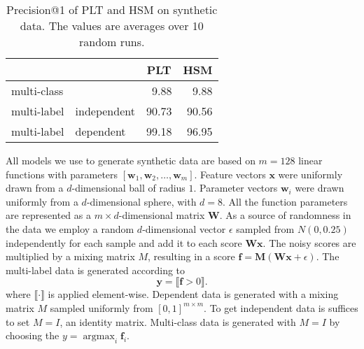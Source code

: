 \documentclass{article}
\renewcommand{\vec}[1]{\boldsymbol{#1}}
\newcommand{\bx}{\vec{x}}
\newcommand{\by}{\vec{y}}
\newcommand{\assert}[1]{\llbracket #1 \rrbracket}
\DeclareMathOperator*{\argmax}{\arg \max}
\begin{document}
\begin{table}[t]
	\begin{center}
	\caption{Precision@1 of PLT and HSM on synthetic data. The values are averages over 10 random runs.}
	\label{tab:synthetic1}
\begin{tabular}{ll|rr}
	\toprule
	\multicolumn{2}{l|}{}                       & \multicolumn{1}{c}{PLT} & \multicolumn{1}{c}{HSM} \\
	\midrule
	\multicolumn{2}{l|}{multi-class}            & 9.88                    & 9.88                    \\
	\midrule
        multi-label & independent & 90.73                   & 90.56                   \\
	multi-label & dependent   & 99.18                   & 96.95                   \\
	\bottomrule
\end{tabular}
\end{center}
\vspace{-0.3cm}
\end{table}

All models we use to generate synthetic data are based on $m = 128$ linear functions 
with parameters $[\boldsymbol{w}_1, \boldsymbol{w}_2, \ldots, \boldsymbol{w}_m]$. Feature vectors $\bx$ were uniformly drawn from a $d$-dimensional ball of radius $1$. Parameter vectors $\boldsymbol{w}_i$ were drawn uniformly from a $d$-dimensional sphere, with $d = 8$. All the function parameters are represented as a $m \times d$-dimensional matrix $\boldsymbol{W}$. 
As a source of randomness in the data we employ a random $d$-dimensional vector $\epsilon$ sampled from $N(0, 0.25)$ independently for each sample and add it to each score $\boldsymbol{W}\bx$. The noisy scores are multiplied by a mixing matrix $M$, resulting in a score $\boldsymbol{f} = \boldsymbol{M} (\boldsymbol{W}\bx +  \epsilon ) $.
The multi-label data is generated according to
\begin{equation*}
\by = \assert{\boldsymbol{f} > 0}.
\end{equation*}
where $\assert{\cdot}$ is applied element-wise.
Dependent data is generated with a mixing matrix $M$ sampled uniformly from $[0, 1]^{m \times m}$. To get independent data is suffices to set $M = I$, an identity matrix.
Multi-class data is generated with $M = I$ by choosing the $y = \argmax_{i}{\boldsymbol{f}_{i}}$.
\end{document}
